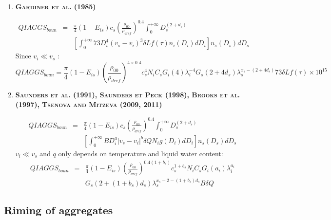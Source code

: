 \begin{enumerate}
  \item {\bf \textsc{Gardiner et al. (1985)}}

\begin{eqnarray}
  QIAGGS_{boun} &=& \frac{\pi}{4} (1 - E_{is}) c_s
                \left( \frac{\rho _{00}}{\rho _{dref}} \right) ^{0.4}
                \int_0 ^{+ \infty} D_s ^{(2 + d_s)} \nonumber \\
                & & \left[ \int_0 ^{+ \infty} 73 D_i ^4 (v_s - v_i)^3
                  \delta L f(\tau) n_i (D_i) dD_i \right]
                n_s (D_s) dD_s \nonumber
\end{eqnarray}
Since $v_i \ll v_s$ :
\begin{equation}
  QIAGGS_{boun} = \frac{\pi}{4} (1 - E_{is})
                \left( \frac{\rho _{00}}{\rho _{dref}} \right) ^{4 \times 0.4}
                c_s ^4 N_i C_s G_i (4) \lambda _i ^{-4}
                G_s (2 + 4d_s) \lambda _s ^{x_s - (2 + 4d_s)}
                73 \delta L f(\tau) \times 10^{15}
\end{equation}

  \item {\bf \textsc{Saunders et al. (1991), Saunders et Peck (1998), Brooks et al. (1997), Tsenova and Mitzeva (2009, 2011)}}

\begin{eqnarray}
  QIAGGS_{boun} &=& \frac{\pi}{4} (1 - E_{is}) c_s
                \left( \frac{\rho _{00}}{\rho _{dref}} \right) ^{0.4}
                \int_0 ^{+ \infty} D_s ^{(2 + d_s)} \nonumber \\
                & & \left[ \int_0 ^{+ \infty} B D_i ^a |v_s - v_i | ^b \delta Q
                  N_i g(D_i) dD_i \right] n_s (D_s) dD_s \nonumber
\end{eqnarray}
$v_i \ll v_s$ and $q$ only depends on temperature and liquid water content:
\begin{eqnarray}
  QIAGGS_{boun} &=& \frac{\pi}{4} (1 - E_{is}) 
                  \left( \frac{\rho _{00}}{\rho _{dref}} \right)^{0.4(1 + b_s)}
                  c_s ^{1 + b_s} N_i C_s G_i (a_i) \lambda _i ^{a_i}
                  \nonumber \\
                & & G_s (2 + (1 + b_s) d_s ) 
                  \lambda _s ^{x_s - 2 - (1 + b_s)d_s} B \delta Q
\end{eqnarray}

\end{enumerate}

\subsection{Riming of aggregates}

